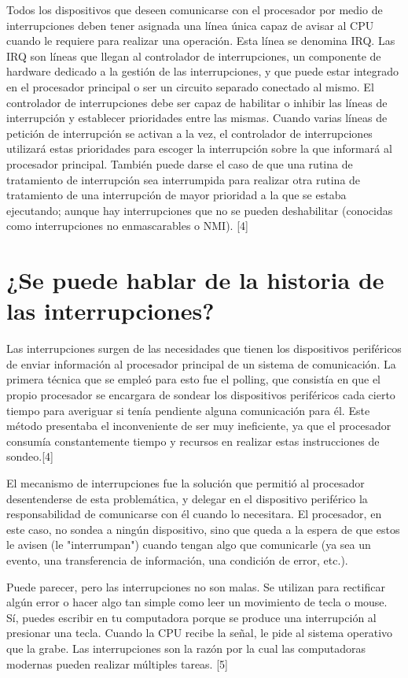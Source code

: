 \documentclass{article}
\begin{document}
Todos los dispositivos que deseen comunicarse con el procesador por medio de interrupciones deben tener asignada una línea única capaz de avisar al CPU cuando le requiere para realizar una operación. Esta línea se denomina IRQ.
Las IRQ son líneas que llegan al controlador de interrupciones, un componente de hardware dedicado a la gestión de las interrupciones, y que puede estar integrado en el procesador principal o ser un circuito separado conectado al mismo. El controlador de interrupciones debe ser capaz de habilitar o inhibir las líneas de interrupción y establecer prioridades entre las mismas. Cuando varias líneas de petición de interrupción se activan a la vez, el controlador de interrupciones utilizará estas prioridades para escoger la interrupción sobre la que informará al procesador principal. También puede darse el caso de que una rutina de tratamiento de interrupción sea interrumpida para realizar otra rutina de tratamiento de una interrupción de mayor prioridad a la que se estaba ejecutando; aunque hay interrupciones que no se pueden deshabilitar (conocidas como interrupciones no enmascarables o NMI).  [4]




\section{¿Se puede hablar de la historia de las interrupciones?}
Las interrupciones surgen de las necesidades que tienen los dispositivos periféricos de enviar información al procesador principal de un sistema de comunicación. 
La primera técnica que se empleó para esto fue el polling, que consistía en que el propio procesador se encargara de sondear los dispositivos periféricos cada cierto tiempo para averiguar si tenía pendiente alguna comunicación para él. Este método presentaba el inconveniente de ser muy ineficiente, ya que el procesador consumía constantemente tiempo y recursos en realizar estas instrucciones de sondeo.[4]

El mecanismo de interrupciones fue la solución que permitió al procesador desentenderse de esta problemática, y delegar en el dispositivo periférico la responsabilidad de comunicarse con él cuando lo necesitara. El procesador, en este caso, no sondea a ningún dispositivo, sino que queda a la espera de que estos le avisen (le "interrumpan") cuando tengan algo que comunicarle (ya sea un evento, una transferencia de información, una condición de error, etc.).

Puede parecer, pero las interrupciones no son malas. Se utilizan para rectificar algún error o hacer algo tan simple como leer un movimiento de tecla o mouse. Sí, puedes escribir en tu computadora porque se produce una interrupción al presionar una tecla. Cuando la CPU recibe la señal, le pide al sistema operativo que la grabe. Las interrupciones son la razón por la cual las computadoras modernas pueden realizar múltiples tareas. [5]
\end{document}
